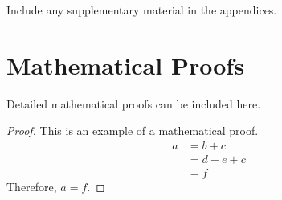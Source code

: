 \documentclass[12pt,a4paper,twoside]{article}
\begin{document}
Include any supplementary material in the appendices.

\lipsum[10] %

\section{Mathematical Proofs}
\label{app:proofs}

Detailed mathematical proofs can be included here.

\begin{proof}
    This is an example of a mathematical proof.
    \begin{align}
        a &= b + c\\
        &= d + e + c\\
        &= f
    \end{align}
    Therefore, $a = f$.
\end{proof}
\end{document}
